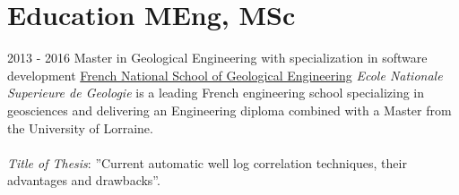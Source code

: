 \documentclass[]{friggeri-cv}
\begin{document}
\section{Education MEng, MSc}
\begin{entrylist}
  \entry
    {2013 - 2016}
    {Master in Geological Engineering with specialization in software development}
    {\href{http://ensg.univ-lorraine.fr/english/}{French National School of Geological Engineering}}
    {\emph{Ecole Nationale Superieure de Geologie} is a leading French engineering school specializing in geosciences and delivering an Engineering diploma combined with a Master from the University of Lorraine.\\ 
    \\
    \emph{Title of Thesis}: ”Current automatic well log correlation techniques, their advantages and drawbacks”.
	}
  	

\end{entrylist}
\vspace*{\fill}
\end{document}
